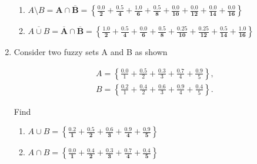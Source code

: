 \documentclass{article}
\begin{document}
\begin{enumerate}
\begin{enumerate}
          \item $A \setminus B \boldsymbol{= A \cap \overline{B} =
                    \left\{
                    \frac{0.0}{2} +
                    \frac{0.5}{4} +
                    \frac{1.0}{6} +
                    \frac{0.5}{8} +
                    \frac{0.0}{10} +
                    \frac{0.0}{12} +
                    \frac{0.0}{14} +
                    \frac{0.0}{16}
                    \right\}}$

          \item $\overline{A \cup B} \boldsymbol{
                    = \overline{A} \cap \overline{B} =
                    \left\{
                    \frac{1.0}{2} +
                    \frac{0.5}{4} +
                    \frac{0.0}{6} +
                    \frac{0.5}{8} +
                    \frac{0.25}{10} +
                    \frac{0.25}{12} +
                    \frac{0.5}{14} +
                    \frac{1.0}{16}
                    \right\}}$
        \end{enumerate}

  \item Consider two fuzzy sets A and B as shown

        \begin{gather*}
          A = \left\{
          \frac{0.0}{1} +
          \frac{0.5}{2} +
          \frac{0.3}{3} +
          \frac{0.7}{4} +
          \frac{0.9}{5}
          \right\}, \\[12pt]
          B = \left\{
          \frac{0.2}{1} +
          \frac{0.4}{2} +
          \frac{0.6}{3} +
          \frac{0.9}{4} +
          \frac{0.4}{5}
          \right\}.
        \end{gather*}

        Find

        \begin{enumerate}
          \item $A \cup B \boldsymbol{=
                    \left\{
                    \frac{0.2}{1} +
                    \frac{0.5}{2} +
                    \frac{0.6}{3} +
                    \frac{0.9}{4} +
                    \frac{0.9}{5}
                    \right\}}$

          \item $A \cap B \boldsymbol{=
                    \left\{
                    \frac{0.0}{1} +
                    \frac{0.4}{2} +
                    \frac{0.3}{3} +
                    \frac{0.7}{4} +
                    \frac{0.4}{5}
                    \right\}}$


\end{enumerate}
\end{enumerate}
\end{document}
